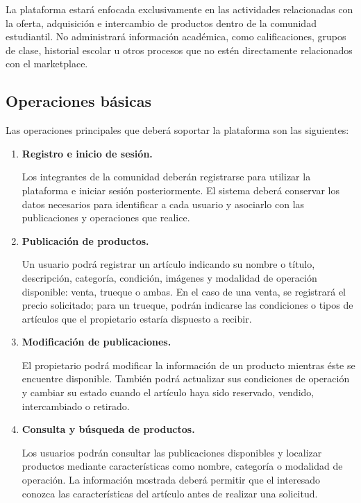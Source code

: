 \documentclass[12pt]{article} %
\begin{document}
La plataforma estará enfocada exclusivamente en las actividades relacionadas con la oferta, adquisición e intercambio de productos dentro de la comunidad estudiantil. No administrará información académica, como calificaciones, grupos de clase, historial escolar u otros procesos que no estén directamente relacionados con el marketplace.

\subsection{Operaciones básicas}

Las operaciones principales que deberá soportar la plataforma son las siguientes:

\begin{enumerate}
    \item \textbf{Registro e inicio de sesión.}
    
    Los integrantes de la comunidad deberán registrarse para utilizar la plataforma e iniciar sesión posteriormente. El sistema deberá conservar los datos necesarios para identificar a cada usuario y asociarlo con las publicaciones y operaciones que realice.

    \item \textbf{Publicación de productos.}
    
    Un usuario podrá registrar un artículo indicando su nombre o título, descripción, categoría, condición, imágenes y modalidad de operación disponible: venta, trueque o ambas. En el caso de una venta, se registrará el precio solicitado; para un trueque, podrán indicarse las condiciones o tipos de artículos que el propietario estaría dispuesto a recibir.

    \item \textbf{Modificación de publicaciones.}
    
    El propietario podrá modificar la información de un producto mientras éste se encuentre disponible. También podrá actualizar sus condiciones de operación y cambiar su estado cuando el artículo haya sido reservado, vendido, intercambiado o retirado.

    \item \textbf{Consulta y búsqueda de productos.}
    
    Los usuarios podrán consultar las publicaciones disponibles y localizar productos mediante características como nombre, categoría o modalidad de operación. La información mostrada deberá permitir que el interesado conozca las características del artículo antes de realizar una solicitud.


\end{enumerate}
\end{document}
